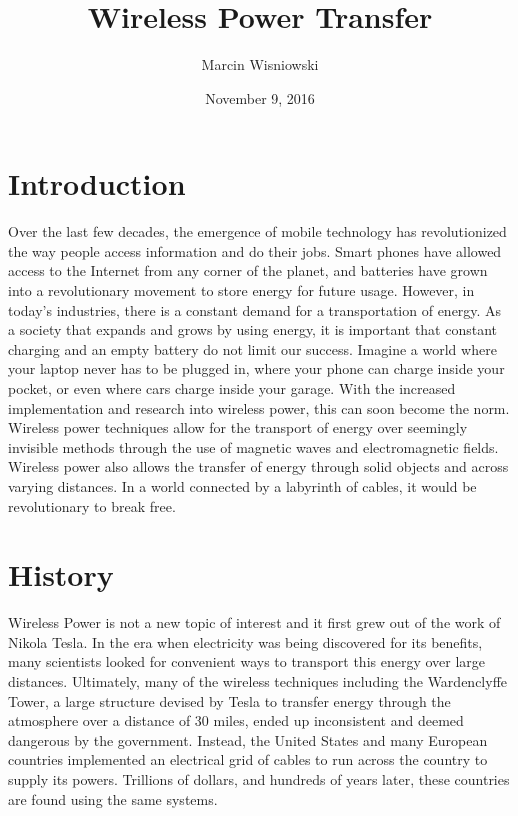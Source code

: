 \documentclass{article}
\title{Wireless Power Transfer}
\author{Marcin Wisniowski}
\date{November 9, 2016}
\begin{document}
\maketitle

\tableofcontents

\section{Introduction}
Over the last few decades, the emergence of mobile technology has revolutionized the way people access information and do their jobs. Smart phones have allowed access to the Internet from any corner of the planet, and batteries have grown into a revolutionary movement to store energy for future usage. However, in today’s industries, there is a constant demand for a transportation of energy. As a society that expands and grows by using energy, it is important that constant charging and an empty battery do not limit our success. Imagine a world where your laptop never has to be plugged in, where your phone can charge inside your pocket, or even where cars charge inside your garage. With the increased implementation and research into wireless power, this can soon become the norm. Wireless power techniques allow for the transport of energy over seemingly invisible methods through the use of magnetic waves and electromagnetic fields. Wireless power also allows the transfer of energy through solid objects and across varying distances. In a world connected by a labyrinth of cables, it would be revolutionary to break free. 

\section {History}
Wireless Power is not a new topic of interest and it first grew out of the work of Nikola Tesla. In the era when electricity was being discovered for its benefits, many scientists looked for convenient ways to transport this energy over large distances. Ultimately, many of the wireless techniques including the Wardenclyffe Tower, a large structure devised by Tesla to transfer energy through the atmosphere over a distance of 30 miles, ended up inconsistent and deemed dangerous by the government. Instead, the United States and many European countries implemented an electrical grid of cables to run across the country to supply its powers. Trillions of dollars, and hundreds of years later, these countries are found using the same systems.
\end{document}

